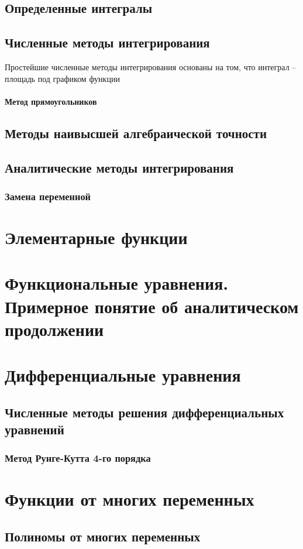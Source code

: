 \documentclass{article}
\begin{document}
\subsection{Определенные интегралы}
\subsection{Численные методы интегрирования}
Простейшие численные методы интегрирования основаны на том, что интеграл -- площадь под графиком функции
\paragraph{Метод прямоугольников}
\subsection{Методы наивысшей алгебраической точности}
\subsection{Аналитические методы интегрирования}
\subsubsection{Замена переменной}
\section{Элементарные функции}
\section{Функциональные уравнения. Примерное понятие об аналитическом продолжении}
\section{Дифференциальные уравнения}
\subsection{Численные методы решения дифференциальных уравнений}
\subsubsection{Метод Рунге-Кутта 4-го порядка}
\section{Функции от многих переменных}
\subsection{Полиномы от многих переменных}
\end{document}
